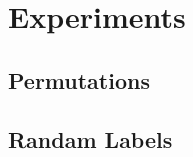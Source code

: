 \section{Experiments}\label{sec:exp}

\subsection{Permutations}\label{sec:permute}

\subsection{Randam Labels}\label{sec:randlabel}
